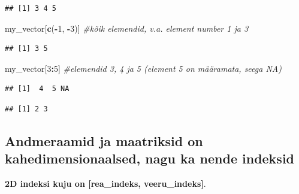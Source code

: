 \documentclass[]{book}
\newenvironment{Shaded}{\begin{snugshade}}{\end{snugshade}}
\newcommand{\KeywordTok}[1]{\textcolor[rgb]{0.13,0.29,0.53}{\textbf{#1}}}
\newcommand{\DecValTok}[1]{\textcolor[rgb]{0.00,0.00,0.81}{#1}}
\newcommand{\CommentTok}[1]{\textcolor[rgb]{0.56,0.35,0.01}{\textit{#1}}}
\newcommand{\OperatorTok}[1]{\textcolor[rgb]{0.81,0.36,0.00}{\textbf{#1}}}
\newcommand{\NormalTok}[1]{#1}
\begin{document}
\begin{verbatim}
## [1] 3 4 5
\end{verbatim}

\begin{Shaded}
\begin{Highlighting}[]
\NormalTok{my_vector[}\KeywordTok{c}\NormalTok{(}\OperatorTok{-}\DecValTok{1}\NormalTok{, }\OperatorTok{-}\DecValTok{3}\NormalTok{)] }\CommentTok{#kõik elemendid, v.a. element number 1 ja 3}
\end{Highlighting}
\end{Shaded}

\begin{verbatim}
## [1] 3 5
\end{verbatim}

\begin{Shaded}
\begin{Highlighting}[]
\NormalTok{my_vector[}\DecValTok{3}\OperatorTok{:}\DecValTok{5}\NormalTok{] }\CommentTok{#elemendid 3, 4 ja 5 (element 5 on määramata, seega NA)}
\end{Highlighting}
\end{Shaded}

\begin{verbatim}
## [1]  4  5 NA
\end{verbatim}

\begin{Shaded}
\end{Shaded}

\begin{verbatim}
## [1] 2 3
\end{verbatim}

\subsection{Andmeraamid ja maatriksid on kahedimensionaalsed, nagu ka
nende
indeksid}\label{andmeraamid-ja-maatriksid-on-kahedimensionaalsed-nagu-ka-nende-indeksid}

\textbf{2D indeksi kuju on {[}rea\_indeks, veeru\_indeks{]}}.
\end{document}

